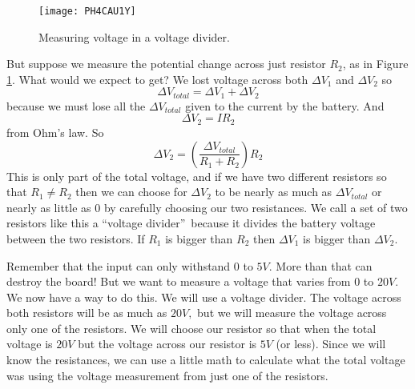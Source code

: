 \begin{figure}[htbp!]
\centering
\texttt{[image: PH4CAU1Y]}
\caption[Measuring voltage in a voltage divider]{Measuring voltage in a
voltage divider.}
\label{fig:voltage_divider_2}
\end{figure}
But suppose we measure the potential change across just resistor $R_{2}$, as
in Figure \ref{fig:voltage_divider_2}.
What would we expect to get? We
lost voltage across both $\Delta V_{1}$ and $\Delta V_{2}$ so 
\begin{equation*}
\Delta V_{total}=\Delta V_{1}+\Delta V_{2}
\end{equation*}%
because we must lose all the $\Delta V_{total}$ given to the current by the
battery. And 
\begin{equation*}
\Delta V_{2}=IR_{2}
\end{equation*}%
from Ohm's law. So
\begin{equation*}
\Delta V_{2}=\left( \frac{\Delta V_{total}}{R_{1}+R_{2}}\right) R_{2}
\end{equation*}%
This is only part of the total voltage, and if we have two different
resistors so that $R_{1}\neq R_{2}$ then we can choose for $\Delta V_{2}$ to
be nearly as much as $\Delta V_{total}$ or nearly as little as $0$ by
carefully choosing our two resistances. We call a set of two resistors like
this a \textquotedblleft voltage divider\textquotedblright\ because it
divides the battery voltage between the two resistors. If $R_{1}$ is bigger
than $R_{2}$ then $\Delta V_{1}$ is bigger than $\Delta V_{2}.$

Remember that the input can only withstand $0$ to $5\unit{V}.$ More than
that can destroy the board! But we want to measure a voltage that varies
from $0$ to $20\unit{V}.$ We now have a way to do this. We will use a
voltage divider. The voltage across both resistors will be as much as $20%
\unit{V},$ but we will measure the voltage across only one of the resistors.
We will choose our resistor so that when the total voltage is $20\unit{V}
$ but the voltage across our resistor is $5\unit{V}$ (or less). Since we
will know the resistances, we can use a little math to calculate what the
total voltage was using the voltage measurement from just one of the
resistors.

